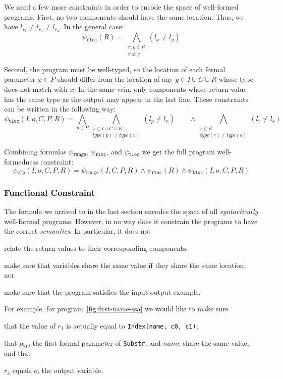 We need a few more constraints in order to encode the space of well-formed
programs. First, no two components should have the same location. Thus,
we have $l_{r_1} \neq l_{r_2} \neq l_{r_3}$. In the general case:
%
\[
  \psi{}_{\mathtt{rloc}}(R) =
  \bigwedge_{\substack{x, y \in R\\ x \not\equiv y}} (l_{x} \neq l_{y}) 
\]

\noindent
Second, the program must be well-typed, so the location of each formal parameter
$x \in P$ should differ from the location of any $y \in I \cup C \cup R$ whose
type does not match with $x$. In the same vein, only components whose return
value has the same type as the output may appear in the last line. These
constraints can be written in the following way:
%
\[
  \psi{}_{\mathtt{tloc}}(I, o, C, P, R) =
  \bigwedge_{p \in P}
  \bigwedge_{\substack{x \in I \cup C \cup R \\ type(p) \neq type(x)}}
  (l_p \neq l_x)
  \qquad \wedge
  \bigwedge_{\substack{r \in R \\ type(r) \neq type(o)}}
  (l_r \neq l_o)
\]

Combining formulas $\psi{}_{\mathtt{range}}$, $\psi{}_{\mathtt{rloc}}$, and
$\psi{}_{\mathtt{tloc}}$ we get the full program well-formedness constraint:
%
\[
  \psi{}_{\mathtt{wfp}}(I, o, C, P, R) =
  \psi{}_{\mathtt{range}}(I, C, P, R)
  \wedge \psi{}_{\mathtt{rloc}}(R)
  \wedge \psi{}_{\mathtt{tloc}}(I, o, C, P, R)
\]

\subsubsection{Functional Constraint}
\label{sec:functional-constraint}

The formula we arrived to in the last section encodes the space of all
\textit{syntactically} well-formed programs. However, in no way does it
constrain the programs to have the correct \textit{semantics}.
In particular, it does not
\begin{enumerate*}[(1)]
\item \label{itm:fc-one} relate the return values to their corresponding components;
\item \label{itm:fc-two} make sure that variables share the same value if they share the same
location; nor
\item \label{itm:fc-three} make sure that the program satisfies the input-output example.
\end{enumerate*}
For example, for program~\ref{fig:first-name-ssa} we would like to make sure
\begin{enumerate*}[(1)]
\item that the value of $r_1$ is actually equal to \lstinline{Index(name, c0, c1)};
\item that $p_{21}$, the first formal parameter of \lstinline{Substr}, and $name$
  share the same value; and that
\item $r_3$ equals $o$, the output variable.
\end{enumerate*}

